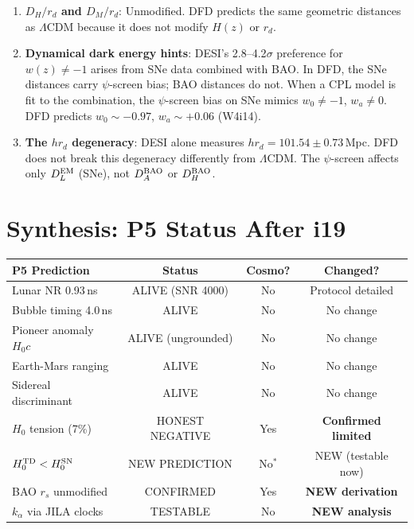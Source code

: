 \documentclass[11pt]{article}
\begin{document}
\begin{enumerate}
\item \textbf{$D_H/r_d$ and $D_M/r_d$}: Unmodified. DFD predicts the
  same geometric distances as $\Lambda$CDM because it does not modify
  $H(z)$ or $r_d$.

\item \textbf{Dynamical dark energy hints}: DESI's 2.8--4.2$\sigma$
  preference for $w(z) \neq -1$ arises from SNe data combined with BAO.
  In DFD, the SNe distances carry $\psi$-screen bias; BAO distances do
  not. When a CPL model is fit to the combination, the $\psi$-screen
  bias on SNe mimics $w_0 \neq -1$, $w_a \neq 0$. DFD predicts
  $w_0 \sim -0.97$, $w_a \sim +0.06$ (W4i14).

\item \textbf{The $h r_d$ degeneracy}: DESI alone measures $h r_d =
  101.54 \pm 0.73$\,Mpc. DFD does not break this degeneracy differently
  from $\Lambda$CDM. The $\psi$-screen affects only $D_L^{\rm EM}$
  (SNe), not $D_A^{\rm BAO}$ or $D_H^{\rm BAO}$.
\end{enumerate}

\section{Synthesis: P5 Status After i19}

\begin{table}[h]
\centering
\begin{tabular}{lccc}
\toprule
\textbf{P5 Prediction} & \textbf{Status} & \textbf{Cosmo?} & \textbf{Changed?} \\
\midrule
Lunar NR 0.93\,ns & ALIVE (SNR 4000) & No & Protocol detailed \\
Bubble timing 4.0\,ns & ALIVE & No & No change \\
Pioneer anomaly $H_0 c$ & ALIVE (ungrounded) & No & No change \\
Earth-Mars ranging & ALIVE & No & No change \\
Sidereal discriminant & ALIVE & No & No change \\
$H_0$ tension (7\%) & HONEST NEGATIVE & Yes & \textbf{Confirmed limited} \\
$H_0^{\rm TD} < H_0^{\rm SN}$ & NEW PREDICTION & No$^*$ & NEW (testable now) \\
BAO $r_s$ unmodified & CONFIRMED & Yes & \textbf{NEW derivation} \\
$k_\alpha$ via JILA clocks & TESTABLE & No & \textbf{NEW analysis} \\
\bottomrule
\end{tabular}
\end{table}
\end{document}
